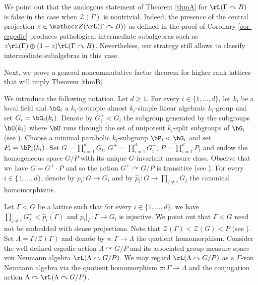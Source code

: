 \begin{rem}
We point out that the analogous statement of Theorem \ref{thmA} for \hbox{$\rL(\Gamma \curvearrowright B)$} is false in the case when $\mathscr Z(\Gamma)$ is nontrivial. Indeed, the presence of the central projection $z \in \mathscr Z(\rL(\Gamma \curvearrowright B))$ as defined in the proof of Corollary \ref{cor-ergodic} produces pathological intermediate subalgebras such as $z \rL(\Gamma) \oplus (1-z)\rL(\Gamma \curvearrowright B)$. Nevertheless, our strategy still allows to classify intermediate subalgebras in this~case.
\end{rem}

Next, we prove a general noncommutative factor theorem for higher rank lattices that will imply Theorem \ref{thmB}.

We introduce the following notation. Let $d \geq 1$. For every $i \in \{1, \dots, d\}$, let $k_i$ be a local field and $\bG_i$ a $k_i$-isotropic almost $k_i$-simple linear algebraic $k_i$-group and set $G_i = \bG_i(k_i)$. Denote by $G_i^+ < G_i$ the subgroup generated by the subgroups $\bU(k_i)$ where $\bU$ runs through the set of unipotent $k_i$-split subgroups of $\bG_i$ (see \cite[Prop.\,I.5.4(i)]{Ma91}). Choose a minimal parabolic $k_i$-subgroup $\bP_i < \bG_i$ and set $P_i = \bP_i(k_i)$.
Set $G = \prod_{i = 1}^d G_i$, $G^+ = \prod_{i = 1}^d G_i^+$, $P = \prod_{i = 1}^d P_i$ and endow the homogeneous space $G/P$ with its unique $G$-invariant measure class. Observe that we have $G = G^+ \cdot P$ and so the action $G^+ \curvearrowright G/P$ is transitive (see \cite[Prop.\,I.5.4(vi)]{Ma91}). For every $i \in \{1, \dots, d\}$, denote by $p_i : G \to G_i$ and by $\widehat p_i : G \to \prod_{j \neq i} G_j$ the canonical homomorphisms.

Let $\Gamma < G$ be a lattice such that for every $i \in \{1, \dots, d\}$, we have $\prod_{j \neq i} G_j^+ < \overline{\widehat p_i(\Gamma)}$ and $p_i|_\Gamma : \Gamma \to G_i$ is injective. We point out that $\Gamma < G$ need not be embedded with dense projections. Note that $\mathscr Z(\Gamma) < \mathscr Z(G) < P$ (see \cite[Lem.\,II.6.3(I)]{Ma91}). Set $\Lambda = \Gamma/\mathscr Z(\Gamma)$ and denote by $\pi : \Gamma \to \Lambda$ the quotient homomorphism. Consider the well-defined ergodic action $\Lambda \curvearrowright G/P$ and its associated group measure space von Neumann algebra $\rL(\Lambda \curvearrowright G/P)$. We may regard $\rL(\Lambda \curvearrowright G/P)$ as a $\Gamma$-von Neumann algebra via the quotient homomorphism $\pi : \Gamma \to \Lambda$ and the conjugation action $\Lambda \curvearrowright \rL(\Lambda \curvearrowright G/P)$.

